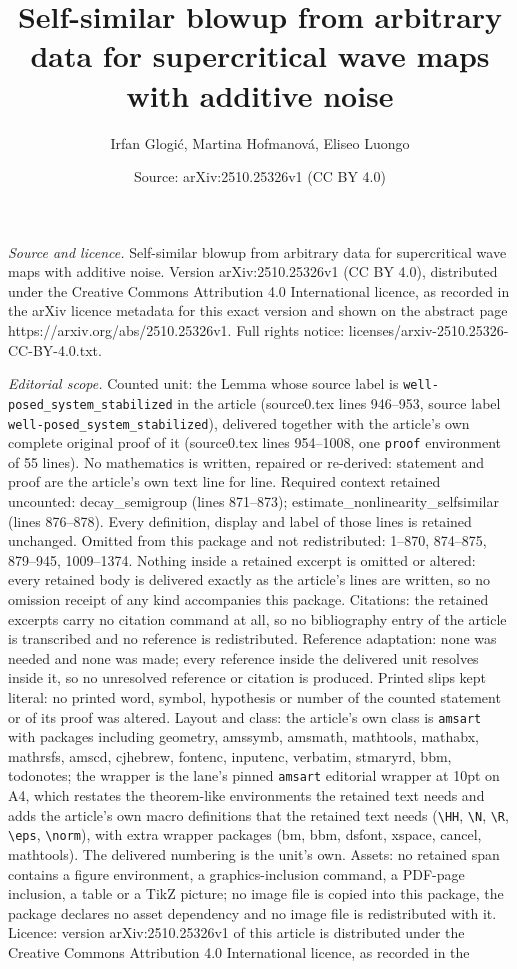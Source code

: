 \documentclass[10pt,a4paper]{amsart}
\title[Self-similar blowup from arbitrary data for supercritical wa]{Self-similar blowup from arbitrary data for supercritical wave maps with additive noise}
\author{Irfan Glogi\'c, Martina Hofmanov\'a, Eliseo Luongo}
\date{Source: arXiv:2510.25326v1 (CC BY 4.0)}
\begin{document}
\maketitle

\noindent\emph{Source and licence.} Self-similar blowup from arbitrary data for supercritical wave maps with additive noise. Version arXiv:2510.25326v1 (CC BY 4.0), distributed under the Creative Commons Attribution 4.0 International licence, as recorded in the arXiv licence metadata for this exact version and shown on the abstract page https://arxiv.org/abs/2510.25326v1. Full rights notice: licenses/arxiv-2510.25326-CC-BY-4.0.txt.\par\smallskip

\noindent\textit{Editorial scope.} Counted unit: the Lemma whose source label is \texttt{well-posed\_system\_stabilized} in the article (source0.tex lines 946--953, source label \texttt{well-posed\_system\_stabilized}), delivered together with the article's own complete original proof of it (source0.tex lines 954--1008, one \texttt{proof} environment of 55 lines). No mathematics is written, repaired or re-derived: statement and proof are the article's own text line for line. Required context retained uncounted: decay\_semigroup (lines 871--873); estimate\_nonlinearity\_selfsimilar (lines 876--878). Every definition, display and label of those lines is retained unchanged. Omitted from this package and not redistributed: 1--870, 874--875, 879--945, 1009--1374. Nothing inside a retained excerpt is omitted or altered: every retained body is delivered exactly as the article's lines are written, so no omission receipt of any kind accompanies this package. Citations: the retained excerpts carry no citation command at all, so no bibliography entry of the article is transcribed and no reference is redistributed. Reference adaptation: none was needed and none was made; every reference inside the delivered unit resolves inside it, so no unresolved reference or citation is produced. Printed slips kept literal: no printed word, symbol, hypothesis or number of the counted statement or of its proof was altered. Layout and class: the article's own class is \texttt{amsart} with packages including geometry, amssymb, amsmath, mathtools, mathabx, mathrsfs, amscd, cjhebrew, fontenc, inputenc, verbatim, stmaryrd, bbm, todonotes; the wrapper is the lane's pinned \texttt{amsart} editorial wrapper at 10pt on A4, which restates the theorem-like environments the retained text needs and adds the article's own macro definitions that the retained text needs (\texttt{\textbackslash HH}, \texttt{\textbackslash N}, \texttt{\textbackslash R}, \texttt{\textbackslash eps}, \texttt{\textbackslash norm}), with extra wrapper packages (bm, bbm, dsfont, xspace, cancel, mathtools). The delivered numbering is the unit's own. Assets: no retained span contains a figure environment, a graphics-inclusion command, a PDF-page inclusion, a table or a TikZ picture; no image file is copied into this package, the package declares no asset dependency and no image file is redistributed with it. Licence: version arXiv:2510.25326v1 of this article is distributed under the Creative Commons Attribution 4.0 International licence, as recorded in the 
\end{document}

